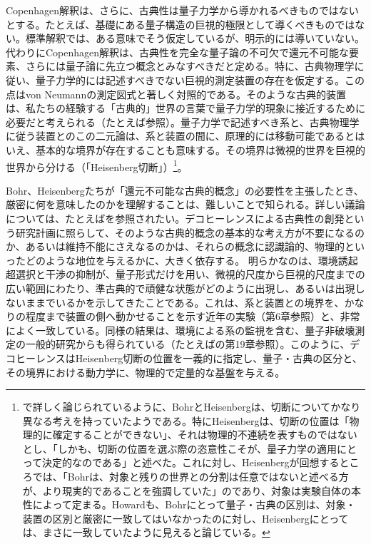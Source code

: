 Copenhagen解釈は、さらに、古典性は量子力学から導かれるべきものではないとする。たとえば、基礎にある量子構造の巨視的極限として導くべきものではない。標準解釈では、ある意味でそう仮定しているが、明示的には導いていない。代わりにCopenhagen解釈は、古典性を完全な量子論の不可欠で還元不可能な要素、さらには量子論に先立つ概念とみなすべきだと定める。特に、古典物理学に従い、量子力学的には記述すべきでない巨視的測定装置の存在を仮定する。この点はvon Neumannの測定図式と著しく対照的である。そのような古典的装置は、私たちの経験する「古典的」世界の言葉で量子力学的現象に接近するために必要だと考えられる（たとえば\cite[209頁]{ref072}参照）。量子力学で記述すべき系と、古典物理学に従う装置とのこの二元論は、系と装置の間に、原理的には移動可能であるとはいえ、基本的な境界が存在することも意味する。その境界は微視的世界を巨視的世界から分ける（「Heisenberg切断」\cite[15頁]{ref392}）\footnote{\cite{ref388}で詳しく論じられているように、BohrとHeisenbergは、切断についてかなり異なる考えを持っていたようである。特にHeisenbergは、切断の位置は「物理的に確定することができない」、それは物理的不連続を表すものではない\cite[49頁]{ref393}とし、「しかも、切断の位置を選ぶ際の恣意性こそが、量子力学の適用にとって決定的なのである」\cite[416頁]{ref394}と述べた。これに対し、Heisenberg\cite[24頁]{ref395}が回想するところでは、「Bohrは、対象と残りの世界との分割は任意ではないと述べる方が、より現実的であることを強調していた」のであり、対象は実験自体の本性によって定まる。Howard\cite{ref396}も、Bohrにとって量子・古典の区別は、対象・装置の区別と厳密に一致してはいなかったのに対し、Heisenbergにとっては、まさに一致していたように見えると論じている。}。

Bohr、Heisenbergたちが「還元不可能な古典的概念」の必要性を主張したとき、厳密に何を意味したのかを理解することは、難しいことで知られる。詳しい議論については、たとえば\cite{ref388,ref396}を参照されたい。デコヒーレンスによる古典性の創発という研究計画に照らして、そのような古典的概念の基本的な考え方が不要になるのか、あるいは維持不能にさえなるのかは、それらの概念に認識論的、物理的といったどのような地位を与えるかに、大きく依存する\cite{ref388}。
\hypertarget{srcpage:336}{}\label{srcpage:336}
明らかなのは、環境誘起超選択と干渉の抑制が、量子形式だけを用い、微視的尺度から巨視的尺度までの広い範囲にわたり、準古典的で頑健な状態がどのように出現し、あるいは出現しないままでいるかを示してきたことである。これは、系と装置との境界を、かなりの程度まで装置の側へ動かせることを示す近年の実験（第6章参照）と、非常によく一致している。同様の結果は、環境による系の監視を含む、量子非破壊測定の一般的研究からも得られている（たとえば\cite{ref138}の第19章参照）。このように、デコヒーレンスはHeisenberg切断の位置を一義的に指定し、量子・古典の区分と、その境界における動力学に、物理的で定量的な基盤を与える。

